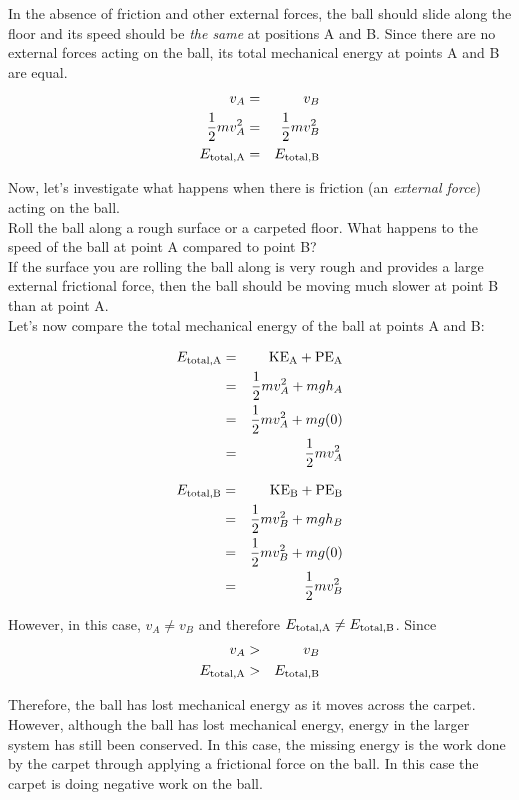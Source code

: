 {In the absence of friction and other external forces, the ball should slide along the floor and its speed should be \textit{the same} at positions A and B. Since there are no external forces acting on the ball, its total mechanical energy at points A and B are equal.\\

\begin{eqnarray*}
v_{A} & = & v_{B}\\
\frac{1}{2}mv_{A}^{2} & = & \frac{1}{2}mv_{B}^{2}\\
E_{\rm{total,A}}  & = & E_{\rm{total,B}} 
\end{eqnarray*}

Now, let's investigate what happens when there is friction (an \textit{external force}) acting on the ball.\\
Roll the ball along a rough surface or a carpeted floor. What happens to the speed of the ball at point A compared to point B? \\
If the surface you are rolling the ball along is very rough and provides a large external frictional force, then the ball should be moving much slower at point B than at point A. \\
Let's now compare the total mechanical energy of the ball at points A and B: \\

\begin{minipage}{.49\textwidth}
\begin{eqnarray*}
E_{\rm{total,A}}  & = & \rm{KE}_{A} + \rm{PE}_{A}  \\
& = & \frac{1}{2}mv_{A}^{2} + mgh_{A} \\
& = & \frac{1}{2}mv_{A}^{2} + mg(0) \\
& = & \frac{1}{2}mv_{A}^{2} 
\end{eqnarray*}
\end{minipage}
\begin{minipage}{.49\textwidth}
\begin{eqnarray*}
E_{\rm{total,B}}  & = & \rm{KE}_{B} + \rm{PE}_{B}  \\
& = & \frac{1}{2}mv_{B}^{2} + mgh_{B} \\
& = & \frac{1}{2}mv_{B}^{2} + mg(0) \\
& = & \frac{1}{2}mv_{B}^{2} 
\end{eqnarray*}
\end{minipage}

However, in this case, $v_{A} \neq v_{B}$ and therefore $E_{\rm{total,A}}  \neq E_{\rm{total,B}} $. Since 
\begin{eqnarray*}
v_{A} & > & v_{B} \\
E_{\rm{total,A}}  & > &  E_{\rm{total,B}}
\end{eqnarray*}

Therefore, the ball has lost mechanical energy as it moves across the carpet. 
However, although the ball has lost mechanical energy, energy in the larger system has still been conserved. In this case, the missing
energy is the work done by the carpet through applying a frictional force on the ball. In this case the carpet is doing negative work on the ball. 
}

